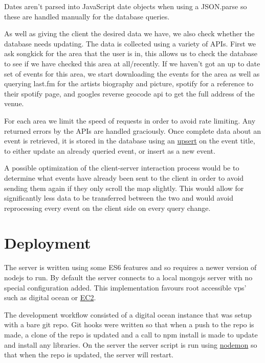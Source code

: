 \documentclass[10pt]{article}
\begin{document}
        Dates aren't parsed into JavaScript date objects when using a JSON.parse so these are handled manually for the database queries.

        As well as giving the client the desired data we have, we also check whether the database needs updating. The data is collected using a variety of APIs. First we ask songkick for the area that the user is in, this allows us to check the database to see if we have checked this area at all/recently. If we haven't got an up to date set of events for this area, we start downloading the events for the area as well as querying last.fm for the artists biography and picture, spotify for a reference to their spotify page, and googles reverse geocode api to get the full address of the venue.

        For each area we limit the speed of requests in order to avoid rate limiting. Any returned errors by the APIs are handled graciously. Once complete data about an event is retrieved, it is stored in the database using an \href{https://docs.mongodb.com/manual/reference/method/db.collection.update/#upsert-option}{upsert} on the event title, to either update an already queried event, or insert as a new event.

        A possible optimization of the client-server interaction process would be to determine what events have already been sent to the client in order to avoid sending them again if they only scroll the map slightly. This would allow for significantly less data to be transferred between the two and would avoid reprocessing every event on the client side on every query change.


    \section{Deployment}
        The server is written using some ES6 features and so requires a newer version of nodejs to run. By default the server connects to a local mongojs server with no special configuration added. This implementation favours root accessible vps' such as digital ocean or \href{https://aws.amazon.com/ec2/}{EC2}.

        The development workflow consisted of a digital ocean instance that was setup with a bare git repo. Git hooks were written so that when a push to the repo is made, a clone of the repo is updated and a call to npm install is made to update and install any libraries. On the server the server script is run using \href{https://github.com/remy/nodemon}{nodemon} so that when the repo is updated, the server will restart.
\end{document}
